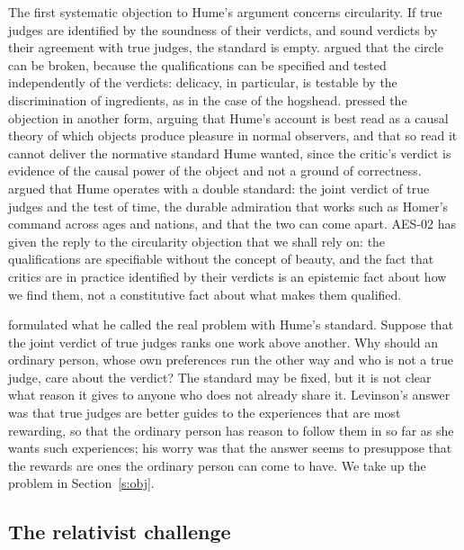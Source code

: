 \documentclass{situationist-preprint}
\begin{document}
The first systematic objection to Hume's argument concerns circularity. If true judges are identified by the soundness of their verdicts, and sound verdicts by their agreement with true judges, the standard is empty. \citet{Kivy1967} argued that the circle can be broken, because the qualifications can be specified and tested independently of the verdicts: delicacy, in particular, is testable by the discrimination of ingredients, as in the case of the hogshead. \citet{Carroll1984} pressed the objection in another form, arguing that Hume's account is best read as a causal theory of which objects produce pleasure in normal observers, and that so read it cannot deliver the normative standard Hume wanted, since the critic's verdict is evidence of the causal power of the object and not a ground of correctness. \citet{Shelley1994} argued that Hume operates with a double standard: the joint verdict of true judges and the test of time, the durable admiration that works such as Homer's command across ages and nations, and that the two can come apart. AES-02 has given the reply to the circularity objection that we shall rely on: the qualifications are specifiable without the concept of beauty, and the fact that critics are in practice identified by their verdicts is an epistemic fact about how we find them, not a constitutive fact about what makes them qualified.

\citet{Levinson2002} formulated what he called the real problem with Hume's standard. Suppose that the joint verdict of true judges ranks one work above another. Why should an ordinary person, whose own preferences run the other way and who is not a true judge, care about the verdict? The standard may be fixed, but it is not clear what reason it gives to anyone who does not already share it. Levinson's answer was that true judges are better guides to the experiences that are most rewarding, so that the ordinary person has reason to follow them in so far as she wants such experiences; his worry was that the answer seems to presuppose that the rewards are ones the ordinary person can come to have. We take up the problem in Section~\ref{s:obj}.

\subsection{The relativist challenge}
\end{document}
